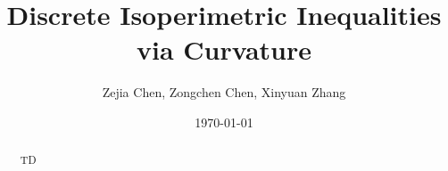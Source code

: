\documentclass[11pt]{article}
\title{Discrete Isoperimetric Inequalities via Curvature}
\author{Zejia Chen, Zongchen Chen, Xinyuan Zhang}
\date{\today}
\theoremstyle{plain}
\theoremstyle{definition}
\theoremstyle{remark}
\begin{document}
\maketitle

\begin{abstract}
TD
\bigskip

\end{abstract}

\thispagestyle{empty}

\newpage 
\thispagestyle{empty}

\tableofcontents

\newpage

\setcounter{page}{1}

\newpage





%



\appendix
\end{document}
